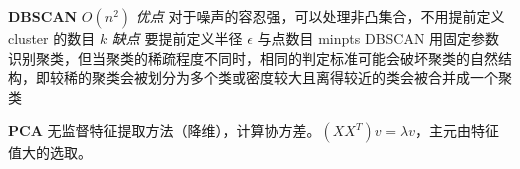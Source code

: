 \documentclass[10pt,a4paper]{ctexart}
\begin{document}
\begin{multicols}{3}
        \textbf{DBSCAN} $O(n^2)$ \emph{优点}
        对于噪声的容忍强，可以处理非凸集合，不用提前定义 cluster 的数目 $k$
        \emph{缺点}
        要提前定义半径 $\epsilon$ 与点数目 minpts DBSCAN 用固定参数识别聚类，但当聚类的稀疏程度不同时，相同的判定标准可能会破坏聚类的自然结构，即较稀的聚类会被划分为多个类或密度较大且离得较近的类会被合并成一个聚类        

        \textbf{PCA} 无监督特征提取方法（降维），计算协方差。$(XX^T)v=\lambda v$，主元由特征值大的选取。
        
    \end{multicols}
\end{document}

